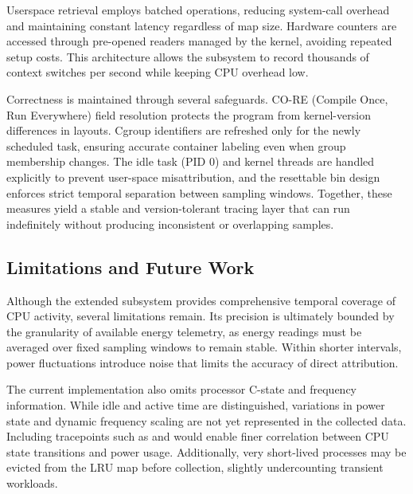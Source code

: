 Userspace retrieval employs batched  operations, reducing system-call overhead and maintaining constant latency regardless of map size.  
Hardware counters are accessed through pre-opened  readers managed by the kernel, avoiding repeated setup costs.  
This architecture allows the subsystem to record thousands of context switches per second while keeping CPU overhead low.

Correctness is maintained through several safeguards.  
CO-RE (Compile Once, Run Everywhere) field resolution protects the program from kernel-version differences in  layouts.  
Cgroup identifiers are refreshed only for the newly scheduled task, ensuring accurate container labeling even when group membership changes.  
The idle task (PID 0) and kernel threads are handled explicitly to prevent user-space misattribution, and the resettable bin design enforces strict temporal separation between sampling windows.  
Together, these measures yield a stable and version-tolerant tracing layer that can run indefinitely without producing inconsistent or overlapping samples.

\subsection{Limitations and Future Work}
\label{subsec:ebpf-collector-limitations}

Although the extended  subsystem provides comprehensive temporal coverage of CPU activity, several limitations remain.  
Its precision is ultimately bounded by the granularity of available energy telemetry, as energy readings must be averaged over fixed sampling windows to remain stable.  
Within shorter intervals, power fluctuations introduce noise that limits the accuracy of direct attribution.  

The current implementation also omits processor C-state and frequency information.  
While idle and active time are distinguished, variations in power state and dynamic frequency scaling are not yet represented in the collected data.  
Including tracepoints such as  and  would enable finer correlation between CPU state transitions and power usage.  
Additionally, very short-lived processes may be evicted from the LRU map before collection, slightly undercounting transient workloads.